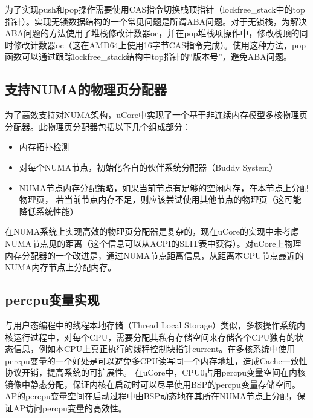 为了实现push和pop操作需要使用CAS指令切换栈顶指针（lockfree\_stack中的top指针）。实现无锁数据结构的一个常见问题是所谓ABA问题\cite{Fraser:2007:CPW:1233307.1233309}。对于无锁栈，为解决ABA问题的方法使用了堆栈修改计数器oc，并在pop堆栈项操作中，修改栈顶的同时修改计数器oc（这在AMD64上使用16字节CAS指令完成）。使用这种方法，pop函数可以通过跟踪lockfree\_stack结构中top指针的``版本号''，避免ABA问题。

\subsection{支持NUMA的物理页分配器}
为了高效支持对NUMA架构，uCore中实现了一个基于非连续内存模型多核物理页分配器。此物理页分配器包括以下几个组成部分：
\begin{itemize}
	\item 内存拓扑检测
	\item 对每个NUMA节点，初始化各自的伙伴系统分配器（Buddy System）
	\item
		NUMA节点内存分配策略，如果当前节点有足够的空闲内存，在本节点上分配物理页，
		若当前节点内存不足，则应该尝试使用其他节点的物理页（这可能降低系统性能）
\end{itemize}

在NUMA系统上实现高效的物理页分配器是复杂的，现在uCore的实现中未考虑NUMA节点见的距离（这个信息可以从ACPI的SLIT表中获得）。对uCore上物理内存分配器的一个改进是，通过NUMA节点距离信息，从距离本CPU节点最近的NUMA内存节点上分配内存。

\subsection{percpu变量实现}
\label{subsec:percpu}

与用户态编程中的线程本地存储（Thread Local Storage）类似，多核操作系统内核运行过程中，对每个CPU，需要分配其私有存储空间来存储各个CPU独有的状态信息，例如本CPU上真正执行的线程控制块指针current。在多核系统中使用percpu变量的一个好处是可以避免多CPU读写同一个内存地址，造成Cache一致性协议开销，提高系统的可扩展性。
在uCore中，CPU0占用percpu变量空间在内核镜像中静态分配，保证内核在启动时可以尽早使用BSP的percpu变量存储空间。AP的percpu变量空间在启动过程中由BSP动态地在其所在NUMA节点上分配，保证AP访问percpu变量的高效性。


